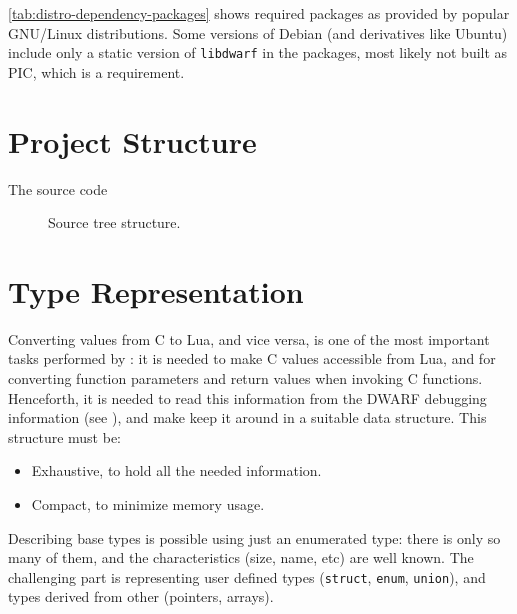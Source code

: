 \autoref{tab:distro-dependency-packages} shows required packages as provided
by popular GNU/Linux distributions. Some versions of Debian (and derivatives
like Ubuntu) include only a static version of \verb|libdwarf| in the packages,
most likely not built as \gls{PIC}, which is a requirement.

\section{Project Structure}

The \Eris* source code

\begin{figure}[h]
    \centering
    \noindent\begin{minipage}{0.75\textwidth}
    \end{minipage}
    \caption{Source tree structure.}
\end{figure}


\section{Type Representation}

Converting values from C to Lua, and vice versa, is one of the most important
tasks performed by \Eris*: it is needed to make C values accessible from Lua,
and for converting function parameters and return values when invoking
C functions. Henceforth, it is needed to read this information from the DWARF
debugging information (see ), and make keep
it around in a suitable data structure. This structure must be:

\begin{itemize}
  \item Exhaustive, to hold all the needed information.
  \item Compact, to minimize memory usage.
\end{itemize}

Describing base types is possible using just an enumerated type: there is only
so many of them, and the characteristics (size, name, etc) are well known. The
challenging part is representing user defined types (\texttt{struct},
\texttt{enum}, \texttt{union}), and types derived from other
(pointers, arrays).

